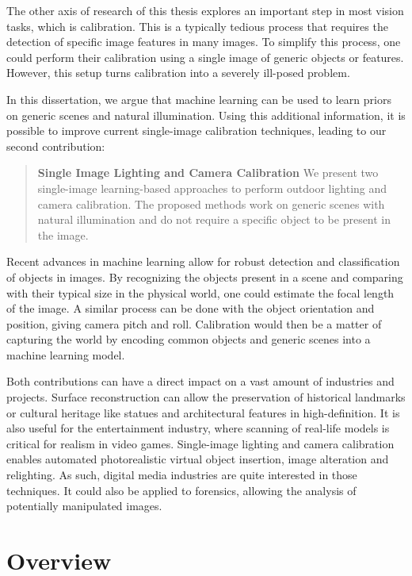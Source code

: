 The other axis of research of this thesis explores an important step in most vision tasks, which is calibration. This is a typically tedious process that requires the detection of specific image features in many images. To simplify this process, one could perform their calibration using a single image of generic objects or features. However, this setup turns calibration into a severely ill-posed problem.

In this dissertation, we argue that machine learning can be used to learn priors on generic scenes and natural illumination. Using this additional information, it is possible to improve current single-image calibration techniques, leading to our second contribution:
%
\begin{quotation}
\textbf{Single Image Lighting and Camera Calibration} We present two single-image learning-based approaches to perform outdoor lighting and camera calibration. The proposed methods work on generic scenes with natural illumination and do not require a specific object to be present in the image.
\end{quotation}

Recent advances in machine learning allow for robust detection and classification of objects in images. By recognizing the objects present in a scene and comparing with their typical size in the physical world, one could estimate the focal length of the image. A similar process can be done with the object orientation and position, giving camera pitch and roll. Calibration would then be a matter of capturing the world by encoding common objects and generic scenes into a machine learning model.

Both contributions can have a direct impact on a vast amount of industries and projects. Surface reconstruction can allow the preservation of historical landmarks or cultural heritage like statues and architectural features in high-definition. It is also useful for the entertainment industry, where scanning of real-life models is critical for realism in video games. Single-image lighting and camera calibration enables automated photorealistic virtual object insertion, image alteration and relighting. As such, digital media industries are quite interested in those techniques. It could also be applied to forensics, allowing the analysis of potentially manipulated images.

\section*{Overview}

